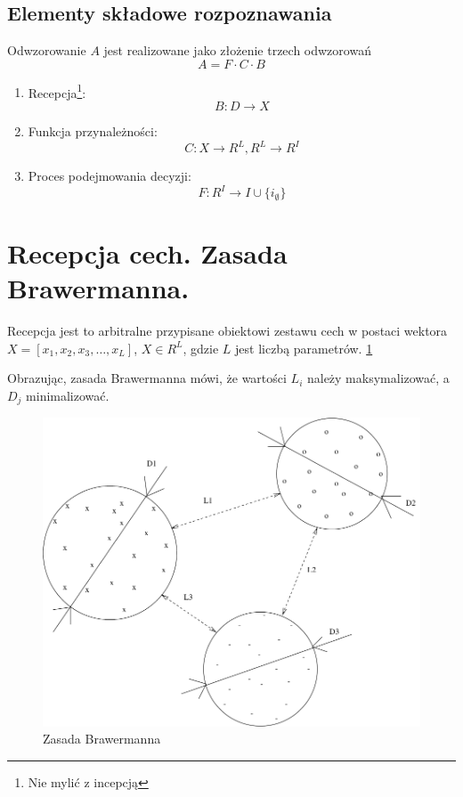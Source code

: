\documentclass[a4paper,10pt]{article}
\begin{document}
\subsection{Elementy składowe rozpoznawania}
Odwzorowanie $A$ jest realizowane jako złożenie trzech odwzorowań
\begin{equation}
 A = F \cdot C \cdot B
\end{equation}
\begin{enumerate}
 \item Recepcja\footnote{Nie mylić z incepcją}:
    \begin{equation}
      B: D \rightarrow X
    \end{equation}
 \item Funkcja przynależności:
    \begin{equation}
      C: X \rightarrow R^L, R^L \rightarrow R^I
    \end{equation}
  \item Proces podejmowania decyzji:
    \begin{equation}
      F: R^I \rightarrow I \cup \{i_{\emptyset}\}
    \end{equation}
\end{enumerate}

\section{Recepcja cech. Zasada Brawermanna.}
Recepcja jest to arbitralne przypisane obiektowi zestawu cech w postaci wektora $X = [x_1, x_2, x_3, \ldots, x_L]$, $X \in R^L$, gdzie $L$ jest liczbą parametrów. \ref{fig:brawermann}

Obrazując, zasada Brawermanna mówi, że wartości $L_i$ należy maksymalizować, a $D_j$ minimalizować.

\begin{figure}[ht]
  \centering
  \includegraphics[width=\textwidth]{brawermann.pdf}
  \caption{Zasada Brawermanna}
  \label{fig:brawermann}
\end{figure}
\end{document}
